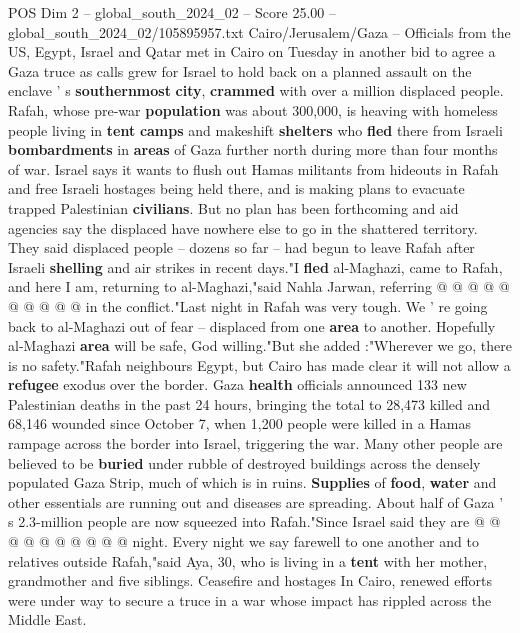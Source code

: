 \begin{textsample}{POS Dim 2 – global\_south\_2024\_02 – Score 25.00 – global\_south\_2024\_02/105895957.txt}  \label{ex:f2_pos_039}
Cairo/Jerusalem/Gaza -- Officials from the US, Egypt, Israel and Qatar met in Cairo on Tuesday in another bid to agree a Gaza truce as calls grew for Israel to hold back on a planned assault on the enclave ' s \textbf{southernmost} \textbf{city}, \textbf{crammed} with over a million displaced people.
Rafah, whose pre-war \textbf{population} was about 300,000, is heaving with homeless people living in \textbf{tent} \textbf{camps} and makeshift \textbf{shelters} who \textbf{fled} there from Israeli \textbf{bombardments} in \textbf{areas} of Gaza further north during more than four months of war.
Israel says it wants to flush out Hamas militants from hideouts in Rafah and free Israeli hostages being held there, and is making plans to evacuate trapped Palestinian \textbf{civilians}.
But no plan has been forthcoming and aid agencies say the displaced have nowhere else to go in the shattered territory.
They said displaced people -- dozens so far -- had begun to leave Rafah after Israeli \textbf{shelling} and air strikes in recent days."I \textbf{fled} al-Maghazi, came to Rafah, and here I am, returning to al-Maghazi,"said Nahla Jarwan, referring @ @ @ @ @ @ @ @ @ @ in the conflict."Last night in Rafah was very tough.
We ' re going back to al-Maghazi out of fear -- displaced from one \textbf{area} to another.
Hopefully al-Maghazi \textbf{area} will be safe, God willing."But she added :"Wherever we go, there is no safety."Rafah neighbours Egypt, but Cairo has made clear it will not allow a \textbf{refugee} exodus over the border.
Gaza \textbf{health} officials announced 133 new Palestinian deaths in the past 24 hours, bringing the total to 28,473 killed and 68,146 wounded since October 7, when 1,200 people were killed in a Hamas rampage across the border into Israel, triggering the war.
Many other people are believed to be \textbf{buried} under rubble of destroyed buildings across the densely populated Gaza Strip, much of which is in ruins. \textbf{Supplies} of \textbf{food}, \textbf{water} and other essentials are running out and diseases are spreading.
About half of Gaza ' s 2.3-million people are now squeezed into Rafah."Since Israel said they are @ @ @ @ @ @ @ @ @ @ night.
Every night we say farewell to one another and to relatives outside Rafah,"said Aya, 30, who is living in a \textbf{tent} with her mother, grandmother and five siblings.
Ceasefire and hostages In Cairo, renewed efforts were under way to secure a truce in a war whose impact has rippled across the Middle East.

\end{textsample}
